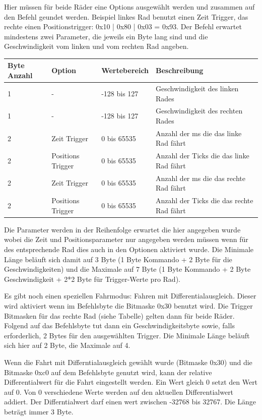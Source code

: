 \documentclass[a4paper]{article}
\begin{document}
	Hier müssen für beide Räder eine Options ausgewählt werden und zusammen auf den Befehl geundet werden. Beispiel linkes
	Rad benutzt einen Zeit Trigger, das rechte einen Positionstrigger: 0x10 | 0x80 | 0x03 = 0x93.
	Der Befehl erwartet mindestens zwei Parameter, die jeweils ein Byte lang sind und die Geschwindigkeit vom linken und
	vom rechten Rad angeben.

	\begin{tabularx}{\linewidth}{|l|l|l|X|}
		\hline
		\textbf{Byte Anzahl} & \textbf{Option} & \textbf{Wertebereich} & \textbf{Beschreibung} \\
		\hline
		\hline
		1					 & - & -128 bis 127 & Geschwindigkeit des linken Rades \\
		\hline
		1					 & - & -128 bis 127 & Geschwindigkeit des rechten Rades\\
		\hline
		2					 & Zeit Trigger & 0 bis 65535 &  Anzahl der ms die das linke Rad fährt\\
		\hline
		2					 & Positions Trigger & 0 bis 65535 &  Anzahl der Ticks die das linke Rad fährt\\
		\hline
		2					 & Zeit Trigger & 0 bis 65535 &  Anzahl der ms die das rechte Rad fährt\\
		\hline
		2					 & Positions Trigger & 0 bis 65535 &  Anzahl der Ticks die das rechte Rad fährt\\
		\hline
	\end{tabularx}
	
	Die Parameter werden in der Reihenfolge erwartet die hier angegeben wurde wobei die Zeit und Positionsparameter nur
	angegeben werden müssen wenn für des entsprechende Rad dies auch in den Optionen aktiviert wurde.
	Die Minimale Länge beläuft sich damit auf 3 Byte (1 Byte Kommando + 2 Byte für die Geschwindigkeiten) und die
	Maximale auf 7 Byte (1 Byte Kommando + 2 Byte Geschwindigkeit + 2*2 Byte für Trigger-Werte pro Rad).

	Es gibt noch einen speziellen Fahrmodus: Fahren mit Differentialausgleich. Dieser wird aktiviert wenn im Befehlsbyte
	die Bitmaske 0x30 benutzt wird. Die Trigger Bitmasken für das rechte Rad (siehe Tabelle) gelten dann für beide Räder.
	Folgend auf das Befehlsbyte tut dann ein Geschwindigkeitsbyte sowie, falls erforderlich, 2 Bytes für den ausgewählten
	Trigger. Die Minimale Länge beläuft sich hier auf 2 Byte, die Maximale auf 4.

	Wenn die Fahrt mit Differntialausgleich gewählt wurde (Bitmaske 0x30) und die Bitmaske 0xc0 auf dem Befehlsbyte
	genutzt wird, kann der relative Differentialwert für die Fahrt eingestellt werden. Ein Wert gleich 0 setzt den Wert auf
	0. Von 0 verschiedene Werte werden auf den aktuellen Differentialwert addiert. Der Differntialwert darf einen wert zwischen
	-32768 bis 32767. Die Länge beträgt immer 3 Byte.
\end{document}
